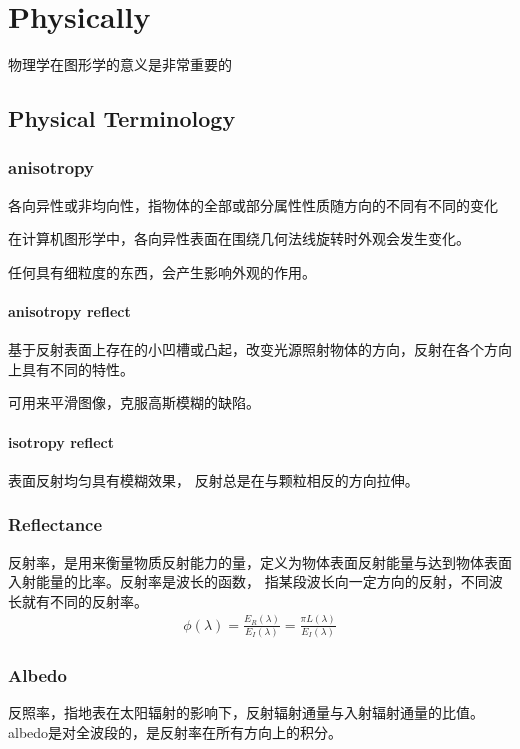 \clearpage
\part{Physically}

物理学在图形学的意义是非常重要的

\chapter{Physical Terminology}

\section{anisotropy}
各向异性或非均向性，指物体的全部或部分属性性质随方向的不同有不同的变化

在计算机图形学中，各向异性表面在围绕几何法线旋转时外观会发生变化。

任何具有细粒度的东西，会产生影响外观的作用。

\subsection{anisotropy reflect}
基于反射表面上存在的小凹槽或凸起，改变光源照射物体的方向，反射在各个方向上具有不同的特性。

可用来平滑图像，克服高斯模糊的缺陷。

\subsection{isotropy reflect}
表面反射均匀具有模糊效果， 反射总是在与颗粒相反的方向拉伸。

\section{Reflectance}

反射率，是用来衡量物质反射能力的量，定义为物体表面反射能量与达到物体表面入射能量的比率。反射率是波长的函数，
指某段波长向一定方向的反射，不同波长就有不同的反射率。
\begin{align*}
    \phi(\lambda) = \frac{E_{R}(\lambda)}{E_{I}(\lambda)} = \frac{\pi L(\lambda)}{E_{I}(\lambda)}
\end{align*}

\section{Albedo}

反照率，指地表在太阳辐射的影响下，反射辐射通量与入射辐射通量的比值。albedo是对全波段的，是反射率在所有方向上的积分。

